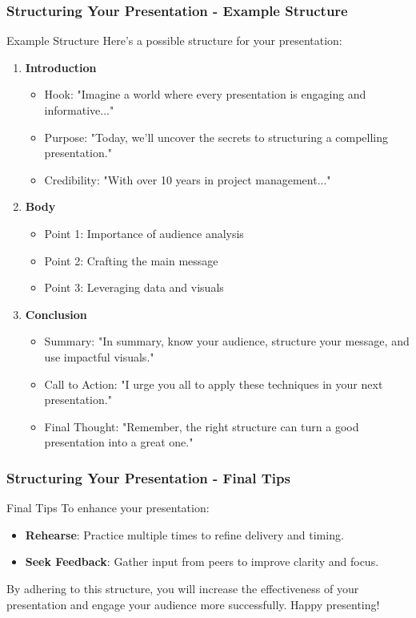 \documentclass[aspectratio=169]{beamer}
\begin{document}
\begin{frame}[fragile]
    \frametitle{Structuring Your Presentation - Example Structure}
    \begin{block}{Example Structure}
        Here’s a possible structure for your presentation:
        \begin{enumerate}
            \item \textbf{Introduction}
                \begin{itemize}
                    \item Hook: "Imagine a world where every presentation is engaging and informative..."
                    \item Purpose: "Today, we'll uncover the secrets to structuring a compelling presentation."
                    \item Credibility: "With over 10 years in project management..."
                \end{itemize}
            \item \textbf{Body}
                \begin{itemize}
                    \item Point 1: Importance of audience analysis
                    \item Point 2: Crafting the main message
                    \item Point 3: Leveraging data and visuals
                \end{itemize}
            \item \textbf{Conclusion}
                \begin{itemize}
                    \item Summary: "In summary, know your audience, structure your message, and use impactful visuals."
                    \item Call to Action: "I urge you all to apply these techniques in your next presentation."
                    \item Final Thought: "Remember, the right structure can turn a good presentation into a great one."
                \end{itemize}
        \end{enumerate}
    \end{block}
\end{frame}

\begin{frame}[fragile]
    \frametitle{Structuring Your Presentation - Final Tips}
    \begin{block}{Final Tips}
        To enhance your presentation:
        \begin{itemize}
            \item \textbf{Rehearse}: Practice multiple times to refine delivery and timing.
            \item \textbf{Seek Feedback}: Gather input from peers to improve clarity and focus.
        \end{itemize}
        By adhering to this structure, you will increase the effectiveness of your presentation and engage your audience more successfully. Happy presenting!
    \end{block}
\end{frame}
\end{document}
